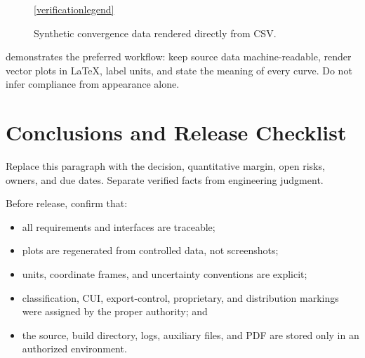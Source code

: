\documentclass{linearspace-report}
\begin{document}
\begin{figure}[htbp]
  \centering
  \par\vspace{0.08in}\ref{verificationlegend}
  \caption{Synthetic convergence data rendered directly from CSV.}
  \label{fig:convergence}
\end{figure}

 demonstrates the preferred workflow: keep source data
machine-readable, render vector plots in LaTeX, label units, and state the
meaning of every curve. Do not infer compliance from appearance alone.

\chapter{Conclusions and Release Checklist}

\begin{LSKeyPoint}
Replace this paragraph with the decision, quantitative margin, open risks,
owners, and due dates. Separate verified facts from engineering judgment.
\end{LSKeyPoint}

Before release, confirm that:
\begin{itemize}
  \item all requirements and interfaces are traceable;
  \item plots are regenerated from controlled data, not screenshots;
  \item units, coordinate frames, and uncertainty conventions are explicit;
  \item classification, CUI, export-control, proprietary, and distribution
    markings were assigned by the proper authority; and
  \item the source, build directory, logs, auxiliary files, and PDF are stored
    only in an authorized environment.
\end{itemize}
\end{document}
